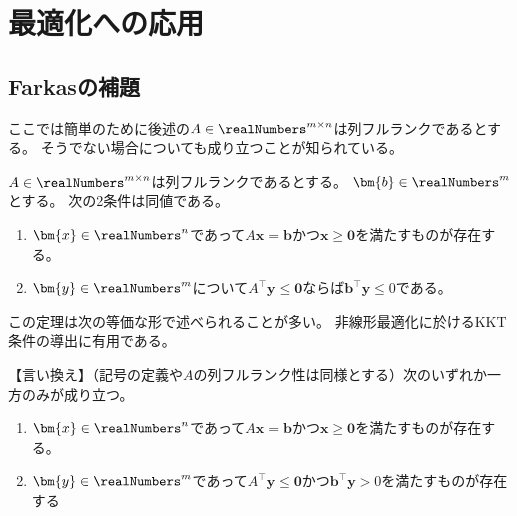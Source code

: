 \chapter{最適化への応用}
    \section{Farkasの補題}
        ここでは簡単のために後述の$A\in\realNumbers^{m\times n}$は列フルランクであるとする。
        そうでない場合についても成り立つことが知られている。
        \begin{shadebox}
            $A\in\realNumbers^{m\times n}$は列フルランクであるとする。
            $\bm{b}\in\realNumbers^m$とする。
            次の2条件は同値である。
            \begin{enumerate}
                \item $\bm{x}\in\realNumbers^n$であって$A\bm{x}=\bm{b}$かつ$\bm{x}\geq\bm{0}$を満たすものが存在する。
                \item $\bm{y}\in\realNumbers^m$について$A^\top\bm{y}\leq\bm{0}$ならば$\bm{b}^\top\bm{y}\leq 0$である。
            \end{enumerate}
        \end{shadebox}
        \begin{commentary}
            この定理は次の等価な形で述べられることが多い。
            非線形最適化に於けるKKT条件の導出に有用である。
            \par\noindent
            【言い換え】（記号の定義や$A$の列フルランク性は同様とする）次のいずれか一方のみが成り立つ。
            \begin{enumerate}
                \item $\bm{x}\in\realNumbers^n$であって$A\bm{x}=\bm{b}$かつ$\bm{x}\geq\bm{0}$を満たすものが存在する。
                \item $\bm{y}\in\realNumbers^m$であって$A^\top\bm{y}\leq\bm{0}$かつ$\bm{b}^\top\bm{y}>0$を満たすものが存在する
            \end{enumerate}
        \end{commentary}
